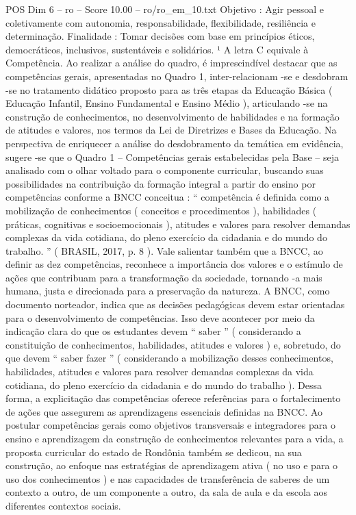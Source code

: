 \begin{textsample}{POS Dim 6 – ro – Score 10.00 – ro/ro\_em\_10.txt}
Objetivo : Agir pessoal e coletivamente com autonomia, responsabilidade, flexibilidade, resiliência e determinação.
Finalidade : Tomar decisões com base em princípios éticos, democráticos, inclusivos, sustentáveis e solidários. ¹ A letra C equivale à Competência.
Ao realizar a análise do quadro, é imprescindível destacar que as competências gerais, apresentadas no Quadro 1, inter-relacionam -se e desdobram -se no tratamento didático proposto para as três etapas da Educação Básica ( Educação Infantil, Ensino Fundamental e Ensino Médio ), articulando -se na construção de conhecimentos, no desenvolvimento de habilidades e na formação de atitudes e valores, nos termos da Lei de Diretrizes e Bases da Educação.
Na perspectiva de enriquecer a análise do desdobramento da temática em evidência, sugere -se que o Quadro 1 – Competências gerais estabelecidas pela Base – seja analisado com o olhar voltado para o componente curricular, buscando suas possibilidades na contribuição da formação integral a partir do ensino por competências conforme a BNCC conceitua : “ competência é definida como a mobilização de conhecimentos ( conceitos e procedimentos ), habilidades ( práticas, cognitivas e socioemocionais ), atitudes e valores para resolver demandas complexas da vida cotidiana, do pleno exercício da cidadania e do mundo do trabalho. ” ( BRASIL, 2017, p. 8 ).
Vale salientar também que a BNCC, ao definir as dez competências, reconhece a importância dos valores e o estímulo de ações que contribuam para a transformação da sociedade, tornando -a mais humana, justa e direcionada para a preservação da natureza.
A BNCC, como documento norteador, indica que as decisões pedagógicas devem estar orientadas para o desenvolvimento de competências.
Isso deve acontecer por meio da indicação clara do que os estudantes devem “ saber ” ( considerando a constituição de conhecimentos, habilidades, atitudes e valores ) e, sobretudo, do que devem “ saber fazer ” ( considerando a mobilização desses conhecimentos, habilidades, atitudes e valores para resolver demandas complexas da vida cotidiana, do pleno exercício da cidadania e do mundo do trabalho ).
Dessa forma, a explicitação das competências oferece referências para o fortalecimento de ações que assegurem as aprendizagens essenciais definidas na BNCC.
Ao postular competências gerais como objetivos transversais e integradores para o ensino e aprendizagem da construção de conhecimentos relevantes para a vida, a proposta curricular do estado de Rondônia também se dedicou, na sua construção, ao enfoque nas estratégias de aprendizagem ativa ( no uso e para o uso dos conhecimentos ) e nas capacidades de transferência de saberes de um contexto a outro, de um componente a outro, da sala de aula e da escola aos diferentes contextos sociais.

\end{textsample}
